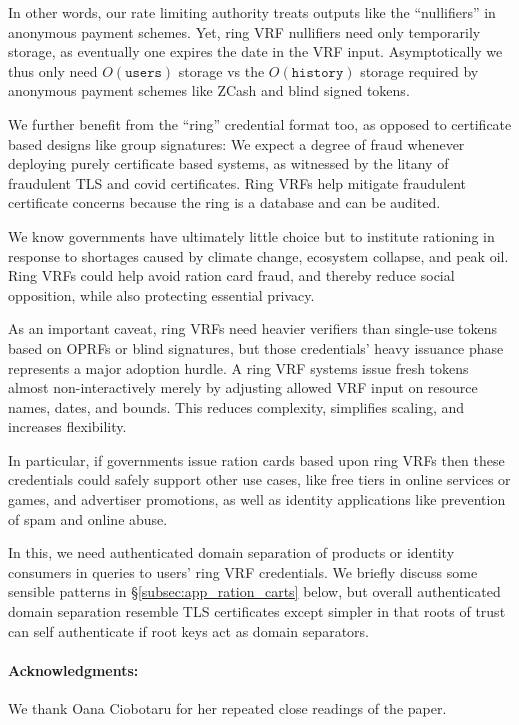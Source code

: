 In other words, our rate limiting authority treats outputs like the
``nullifiers'' in anonymous payment schemes.
Yet, ring VRF nullifiers need only temporarily storage, as eventually one
expires the date in the VRF input.  Asymptotically we thus only need
$O(\mathtt{users})$ storage vs the $O(\mathtt{history})$ storage
required by anonymous payment schemes like ZCash and blind signed tokens.

We further benefit from the ``ring'' credential format too,
 as opposed to certificate based designs like group signatures:\quad 
We expect a degree of fraud whenever deploying purely certificate
based systems, as witnessed by the litany of fraudulent TLS and covid
certificates.  Ring VRFs help mitigate fraudulent certificate concerns
because the ring is a database and can be audited.

We know governments have ultimately little choice but to institute
rationing in response to shortages caused by climate change, ecosystem
collapse, and peak oil.  Ring VRFs could help avoid ration card fraud,
and thereby reduce social opposition, while also protecting essential privacy.

As an important caveat, ring VRFs need heavier verifiers than single-use
tokens based on OPRFs \cite{PrivacyPass} or blind signatures, but
those credentials' heavy issuance phase represents a major adoption hurdle.
A ring VRF systems issue fresh tokens almost non-interactively merely by
adjusting allowed VRF input on resource names, dates, and bounds.
This reduces complexity, simplifies scaling, and increases flexibility.

In particular, if governments issue ration cards based upon ring VRFs
then these credentials could safely support other use cases, like
free tiers in online services or games, and advertiser promotions,
as well as identity applications like prevention of spam and online abuse.

In this, we need authenticated domain separation of products or identity
consumers in queries to users' ring VRF credentials.  We briefly discuss
some sensible patterns in \S\ref{subsec:app_ration_carts} below, but
overall authenticated domain separation resemble TLS certificates except
simpler in that roots of trust can self authenticate if root keys act as
domain separators.

\paragraph{Acknowledgments:}

We thank Oana Ciobotaru for her repeated close readings of the paper.




\endinput




As a field, anonymous credentials come in myriad flavors,
many of which exist to limits the anonymity provided, ala
 attribute based credentials and group signatures. %
%
Ring VRFs by weakening anonymity only contextually provide a safer,
more private, more flexible, more powerful, and more ethical
choice for all everyday anonymous credential use cases.  %


